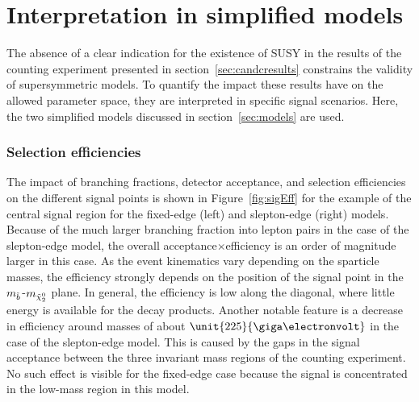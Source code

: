 \section{Interpretation in simplified models}
The absence of a clear indication for the existence of SUSY in the results of the counting experiment presented in section~\ref{sec:candcresults} constrains the validity of supersymmetric models. To quantify the impact these results have on the allowed parameter space, they are interpreted in specific signal scenarios. Here, the two simplified models discussed in section~\ref{sec:models} are used. 

\subsubsection{Selection efficiencies}
The impact of branching fractions, detector acceptance, and selection efficiencies on the different signal points is shown in Figure~\ref{fig:sigEff} for the example of the central signal region for the fixed-edge (left) and slepton-edge (right) models. Because of the much larger branching fraction into lepton pairs in the case of the slepton-edge model, the overall acceptance$\times$efficiency is an order of magnitude larger in this case. As the event kinematics vary depending on the sparticle masses, the efficiency strongly depends on the position of the signal point in the $m_{\tilde{b}}$-$m_{{\tilde{\chi}^0_2}}$ plane. In general, the efficiency is low along the diagonal, where little energy is available for the decay products. Another notable feature is a decrease in efficiency around \secondchi masses of about $\unit{225}{\giga\electronvolt}$ in the case of the slepton-edge model. This is caused by the gaps in the signal acceptance between the three invariant mass regions of the counting experiment. No such effect is visible for the fixed-edge case because the signal is concentrated in the low-mass region in this model.  
